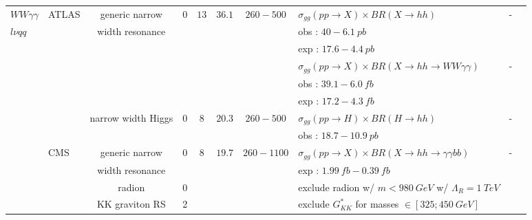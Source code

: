 \begin{table}[h!]
{\begin{tabular}{|l|l|c|c|c|c|c|l|c|c|}
\cline{1-10}


$WW \gamma\gamma$            &ATLAS        &generic narrow            &0    &$13$        &$36.1$        &$260-500$        &$\sigma_{gg}(pp\rightarrow X)\times BR(X\rightarrow hh)$                 &-    &\cite{Aaboud:2018ewm}\\
$l\nu qq$                &        &width resonance         &    &        &        &            &obs : $40-6.1\ pb$                                    &    &\\
                    &        &                &    &        &        &            &exp : $17.6-4.4\ pb$                                    &    &\\
                    &        &                &    &        &        &            &$\sigma_{gg}(pp\rightarrow X)\times BR(X\rightarrow hh\rightarrow WW\gamma\gamma)$                     &-    &\\
                    &        &                &    &        &        &            &obs : $39.1-6.0\ fb$                                    &    &\\
                    &        &                &    &        &        &            &exp : $17.2-4.3\ fb$                                    &    &\\

\cline{3-10}
                    &        &narrow width Higgs        &0    &$8$        &$20.3$        &$260-500$        &$\sigma_{gg}(pp\rightarrow H)\times BR(H\rightarrow hh)$                 &-    &\cite{Aad:2015xja}\\
                    &        &                &    &        &        &            &obs : $18.7-10.9\ pb$                                    &    &\\

\cline{2-10}
                    &CMS        &generic narrow            &0    &$8$        &$19.7$        &$260-1100$        &$\sigma_{gg}(pp\rightarrow X)\times BR(X\rightarrow hh\rightarrow \gamma\gamma bb)$     &-    &\cite{Khachatryan:2016sey}\\
                    &        &width resonance        &    &        &        &                                            &exp : $1.99\ fb-0.39\ fb$                                &    &\\
                    &        &radion                &0    &        &        &            &exclude radion w/ $m<980\ GeV$ w/ $\Lambda_R=1\ TeV$            &    &\\
                    &        &KK graviton RS            &2    &        &        &            &exclude $G_{KK}^{*}$ for masses $\in [325 ; 450\ GeV]$        &    &\\
\hline



\end{tabular}}
\end{table}
